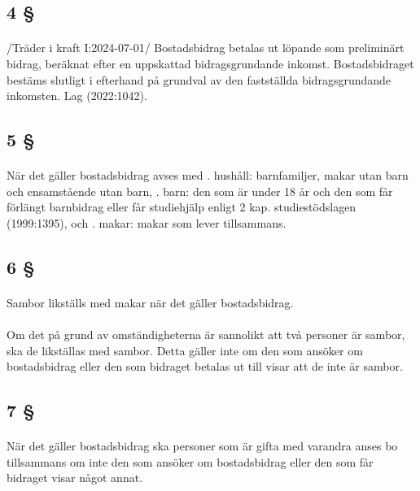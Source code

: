 \documentclass[a4paper,notitlepage,openany,10pt]{book}
\begin{document}
\subsection*{4 §}
\paragraph*{}
/Träder i kraft I:2024-07-01/
Bostadsbidrag betalas ut löpande som preliminärt bidrag, beräknat efter en uppskattad bidragsgrundande inkomst. Bostadsbidraget bestäms slutligt i efterhand på grundval av den fastställda bidragsgrundande inkomsten.
Lag (2022:1042).
\subsection*{5 §}
\paragraph*{}
När det gäller bostadsbidrag avses med
. hushåll: barnfamiljer, makar utan barn och ensamstående utan barn,
. barn: den som är under 18 år och den som får förlängt barnbidrag eller får studiehjälp enligt 2 kap.
studiestödslagen (1999:1395), och
. makar: makar som lever tillsammans.
\subsection*{6 §}
\paragraph*{}
Sambor likställs med makar när det gäller bostadsbidrag.
\paragraph*{}
Om det på grund av omständigheterna är sannolikt att två personer är sambor, ska de likställas med sambor. Detta gäller inte om den som ansöker om bostadsbidrag eller den som bidraget betalas ut till visar att de inte är sambor.
\subsection*{7 §}
\paragraph*{}
När det gäller bostadsbidrag ska personer som är gifta med varandra anses bo tillsammans om inte den som ansöker om bostadsbidrag eller den som får bidraget visar något annat.
\end{document}
